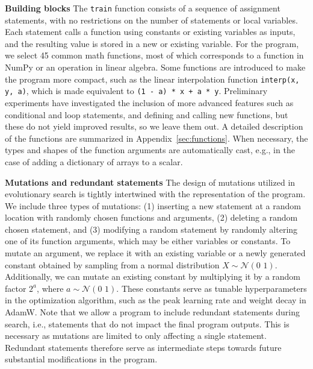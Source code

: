 \documentclass{article}
\begin{document}
\textbf{Building blocks} 
The \verb|train| function consists of a sequence of assignment statements, with no restrictions on the number of statements or local variables. Each statement calls a function using constants or existing variables as inputs, and the resulting value is stored in a new or existing variable. For the program, we select 45 common math functions, most of which corresponds to a function in NumPy or an operation in linear algebra. Some functions are introduced to make the program more compact, such as the linear interpolation function \verb|interp(x, y, a)|, which is made equivalent to \verb|(1 - a) * x + a * y|. 
Preliminary experiments have investigated the inclusion of more advanced features such as conditional and loop statements, and defining and calling new functions, but these do not yield improved results, so we leave them out. A detailed description of the functions are summarized in Appendix~\ref{sec:functions}. 
When necessary, the types and shapes of the function arguments are automatically cast, e.g., in the case of adding a dictionary of arrays to a scalar.



\textbf{Mutations and redundant statements} 
The design of mutations utilized in evolutionary search is tightly intertwined with the representation of the program. We include three types of mutations: (1) inserting a new statement at a random location with randomly chosen functions and arguments, (2) deleting a random chosen statement, and (3) modifying a random statement by randomly altering one of its function arguments, which may be either variables or constants. To mutate an argument, we replace it with an existing variable or a newly generated constant obtained by sampling from a normal distribution $X \sim \mathcal{N}(0\,\,1)$. 
Additionally, we can mutate an existing constant by multiplying it by a random factor $2^{a}$, where $a \sim \mathcal{N}(0\,\,1)$. 
These constants serve as tunable hyperparameters in the optimization algorithm, such as the peak learning rate and weight decay in AdamW.
Note that we allow a program to include redundant statements during search, i.e., statements that do not impact the final program outputs.
This is necessary as mutations are limited to only affecting a single statement. Redundant statements therefore serve as intermediate steps towards future substantial modifications in the program.
\end{document}
